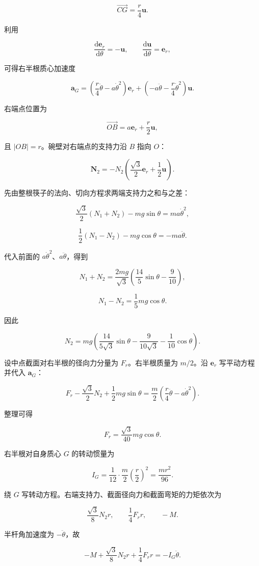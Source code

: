 \documentclass[12pt,a4paper,UTF8]{ctexart}
\begin{document}
\[\overrightarrow{CG}=\frac r4\bm u.\]

利用

\[\frac{\mathrm{d}\bm e_r}{\mathrm{d}\theta}=-\bm u,\qquad
\frac{\mathrm{d}\bm u}{\mathrm{d}\theta}=\bm e_r,\]

可得右半根质心加速度

\[\bm a_G=\left(\frac r4\ddot\theta-a\dot\theta^2\right)\bm e_r
+\left(-a\ddot\theta-\frac r4\dot\theta^2\right)\bm u.\]

右端点位置为

\[\overrightarrow{OB}=a\bm e_r+\frac r2\bm u,\]

且 \(|OB|=r\)。碗壁对右端点的支持力沿 \(B\) 指向 \(O\)：

\[\bm N_2=-N_2\left(\frac{\sqrt3}{2}\bm e_r+\frac12\bm u\right).\]

先由整根筷子的法向、切向方程求两端支持力之和与之差：

\[\frac{\sqrt3}{2}(N_1+N_2)-mg\sin\theta=ma\dot\theta^2,\]

\[\frac12(N_1-N_2)-mg\cos\theta=-ma\ddot\theta.\]

代入前面的 \(a\dot\theta^2\)、\(a\ddot\theta\)，得到

\[N_1+N_2=\frac{2mg}{\sqrt3}\left(\frac{14}{5}\sin\theta-\frac9{10}\right),\]

\[N_1-N_2=\frac15mg\cos\theta.\]

因此

\[N_2=mg\left(
\frac{14}{5\sqrt3}\sin\theta-
\frac{9}{10\sqrt3}-\frac1{10}\cos\theta
\right).\]

设中点截面对右半根的径向力分量为 \(F_r\)。右半根质量为 \(m/2\)。沿
\(\bm e_r\) 写平动方程并代入 \(\bm a_G\)：

\[F_r-\frac{\sqrt3}{2}N_2+\frac12mg\sin\theta
=\frac m2\left(\frac r4\ddot\theta-a\dot\theta^2\right).\]

整理可得

\[F_r=\frac{\sqrt3}{40}mg\cos\theta.\]

右半根对自身质心 \(G\) 的转动惯量为

\[I_G=\frac1{12}\cdot\frac m2\left(\frac r2\right)^2
=\frac{mr^2}{96}.\]

绕 \(G\) 写转动方程。右端支持力、截面径向力和截面弯矩的力矩依次为

\[\frac{\sqrt3}{8}N_2r,\qquad \frac14F_rr,\qquad -M.\]

半杆角加速度为 \(-\ddot\theta\)，故

\[-M+\frac{\sqrt3}{8}N_2r+\frac14F_rr
=-I_G\ddot\theta.\]
\end{document}
